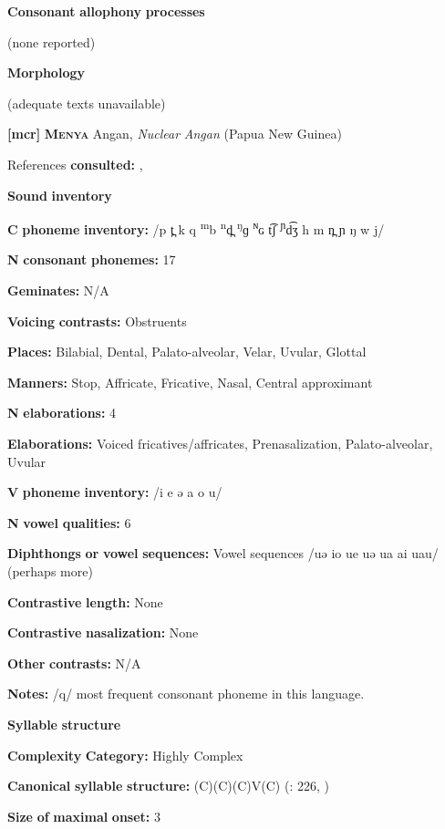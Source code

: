 \begin{styleBody}
\textbf{Consonant} \textbf{allophony} \textbf{processes}

(none reported)

\textbf{Morphology}

(adequate texts unavailable)

\textbf{[mcr]}   \textbf{\textsc{Menya}}    Angan, \textit{Nuclear} \textit{Angan} (Papua New Guinea)

References \textbf{consulted:} \citet{Whitehead1992}, \citet{Whitehead2004}

\textbf{Sound} \textbf{inventory}

\textbf{C} \textbf{phoneme} \textbf{inventory:} /p t̪ k q \textsuperscript{m}b \textsuperscript{n}d̪ \textsuperscript{ŋ}ɡ \textsuperscript{ɴ}ɢ t͡ʃ \textsuperscript{ɲ}d͡ʒ h m n̪ ɲ ŋ w j/

\textbf{N} \textbf{consonant} \textbf{phonemes:} 17

\textbf{Geminates:} N/A

\textbf{Voicing} \textbf{contrasts:} Obstruents

\textbf{Places:} Bilabial, Dental, Palato-alveolar, Velar, Uvular, Glottal

\textbf{Manners:} Stop, Affricate, Fricative, Nasal, Central approximant

\textbf{N} \textbf{elaborations:} 4

\textbf{Elaborations:} Voiced fricatives/affricates, Prenasalization, Palato-alveolar, Uvular

\textbf{V} \textbf{phoneme} \textbf{inventory:} /i e ə a o u/

\textbf{N} \textbf{vowel} \textbf{qualities:} 6

\textbf{Diphthongs} \textbf{or} \textbf{vowel} \textbf{sequences:} Vowel sequences /uə io ue uə ua ai uau/ (perhaps more)

\textbf{Contrastive} \textbf{length:} None

\textbf{Contrastive} \textbf{nasalization:} None

\textbf{Other} \textbf{contrasts:} N/A

\textbf{Notes:} /q/ most frequent consonant phoneme in this language.

\textbf{Syllable} \textbf{structure}

\textbf{Complexity} \textbf{Category:} Highly Complex

\textbf{Canonical} \textbf{syllable} \textbf{structure:} (C)(C)(C)V(C) (\citealt{Whitehead2004}: 226, \citealt{Whitehead1992})

\textbf{Size} \textbf{of} \textbf{maximal} \textbf{onset:} 3


\end{styleBody}
